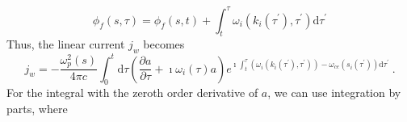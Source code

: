 \begin{equation}
    \phi_f(s,\tau) =\phi_f(s,t) + \int_t^\tau \omega_{i}(k_i(\tau^\prime),\tau^\prime) \mathrm{d}\tau^\prime
\end{equation}
Thus, the linear current $j_w$ becomes
\begin{equation}
    j_w = -\frac{\omega_p^2(s)}{4 \pi c}\int_0^t \mathrm{d} \tau \left(\frac{\partial a}{\partial \tau} + \imath \omega_i(\tau) a\right)e^{\imath \int_t^\tau (\omega_i(k_i(\tau^\prime),\tau^\prime)) - \omega_{ce}(s_i(\tau^\prime))\mathrm{d}\tau^\prime}~.
\end{equation}
For the integral with the zeroth order derivative of $a$, we can use integration by parts, where
